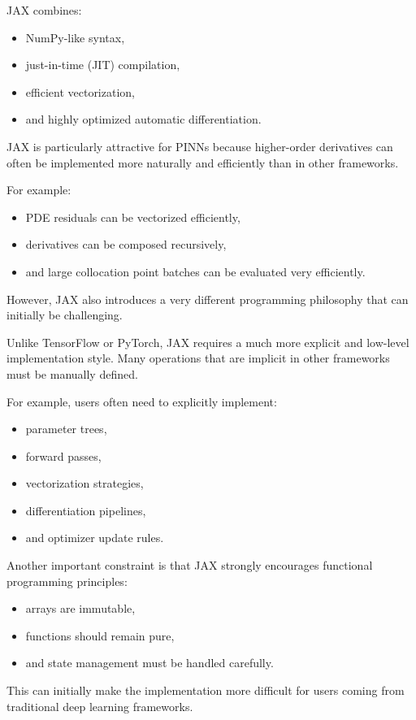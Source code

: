 JAX combines:
\begin{itemize}
    \item NumPy-like syntax,
    \item just-in-time (JIT) compilation,
    \item efficient vectorization,
    \item and highly optimized automatic differentiation.
\end{itemize}

JAX is particularly attractive for PINNs because higher-order derivatives can often be implemented more naturally and efficiently than in other frameworks.

For example:
\begin{itemize}
    \item PDE residuals can be vectorized efficiently,
    \item derivatives can be composed recursively,
    \item and large collocation point batches can be evaluated very efficiently.
\end{itemize}

However, JAX also introduces a very different programming philosophy that can initially be challenging.

Unlike TensorFlow or PyTorch, JAX requires a much more explicit and low-level implementation style. Many operations that are implicit in other frameworks must be manually defined.

For example, users often need to explicitly implement:
\begin{itemize}
    \item parameter trees,
    \item forward passes,
    \item vectorization strategies,
    \item differentiation pipelines,
    \item and optimizer update rules.
\end{itemize}

Another important constraint is that JAX strongly encourages functional programming principles:
\begin{itemize}
    \item arrays are immutable,
    \item functions should remain pure,
    \item and state management must be handled carefully.
\end{itemize}

This can initially make the implementation more difficult for users coming from traditional deep learning frameworks.

